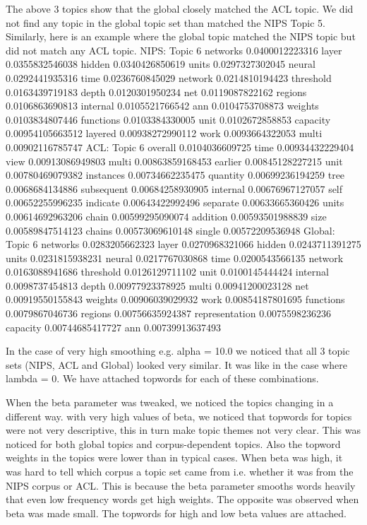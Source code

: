 \documentclass{article}
\begin{document}
The above 3 topics show that the global closely matched the ACL topic. We did not find any topic in the global topic set than matched the NIPS Topic 5.
Similarly, here is an example where the global topic matched the NIPS topic but did not match any ACL topic.
NIPS:
Topic 6
networks 0.0400012223316
layer 0.0355832546038
hidden 0.0340426850619
units 0.0297327302045
neural 0.0292441935316
time 0.0236760845029
network 0.0214810194423
threshold 0.0163439719183
depth 0.0120301950234
net 0.0119087822162
regions 0.0106863690813
internal 0.0105521766542
ann 0.0104753708873
weights 0.0103834807446
functions 0.0103384330005
unit 0.0102672858853
capacity 0.00954105663512
layered 0.00938272990112
work 0.0093664322053
multi 0.00902116785747
ACL:
Topic 6
overall 0.0104036609725
time 0.00934432229404
view 0.00913086949803
multi 0.00863859168453
earlier 0.00845128227215
unit 0.00780469079382
instances 0.00734662235475
quantity 0.00699236194259
tree 0.0068684134886
subsequent 0.00684258930905
internal 0.00676967127057
self 0.00652255996235
indicate 0.00643422992496
separate 0.00633665360426
units 0.00614692963206
chain 0.00599295090074
addition 0.00593501988839
size 0.00589847514123
chains 0.00573069610148
single 0.00572209536948
Global:
Topic 6
networks 0.0283205662323
layer 0.0270968321066
hidden 0.0243711391275
units 0.0231815938231
neural 0.0217767030868
time 0.0200543566135
network 0.0163088941686
threshold 0.0126129711102
unit 0.0100145444424
internal 0.0098737454813
depth 0.00977923378925
multi 0.00941200023128
net 0.00919550155843
weights 0.00906039029932
work 0.00854187801695
functions 0.0079867046736
regions 0.00756635924387
representation 0.0075598236236
capacity 0.00744685417727
ann 0.00739913637493

In the case of very high smoothing e.g. alpha = 10.0 we noticed that all 3 topic sets (NIPS, ACL and Global) looked very similar. It was like in the case where lambda = 0.
We have attached topwords for each of these combinations.

When the beta parameter was tweaked, we noticed the topics changing in a different way. with very high values of beta, we noticed that topwords for topics were not very descriptive, this in turn make topic themes not very clear. This was noticed for both global topics and corpus-dependent topics. Also the topword weights in the topics were lower than in typical cases. When beta was high, it was hard to tell which corpus a topic set came from i.e. whether it was from the NIPS corpus or ACL. This is because the beta parameter smooths words heavily that even low frequency words get high weights. The opposite was observed when beta was made small. The topwords for high and low beta values are attached.
\end{document}
